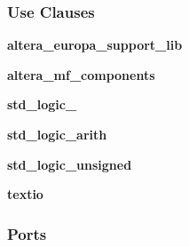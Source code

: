\subsubsection*{Use Clauses}
 \begin{DoxyCompactItemize}
\item 
{\bf altera\+\_\+europa\+\_\+support\+\_\+lib}   
\item 
{\bf altera\+\_\+mf\+\_\+components}   
\item 
{\bf std\+\_\+logic\+\_}   
\item 
{\bf std\+\_\+logic\+\_\+arith}   
\item 
{\bf std\+\_\+logic\+\_\+unsigned}   
\item 
{\bf textio}   
\end{DoxyCompactItemize}
\subsubsection*{Ports}
